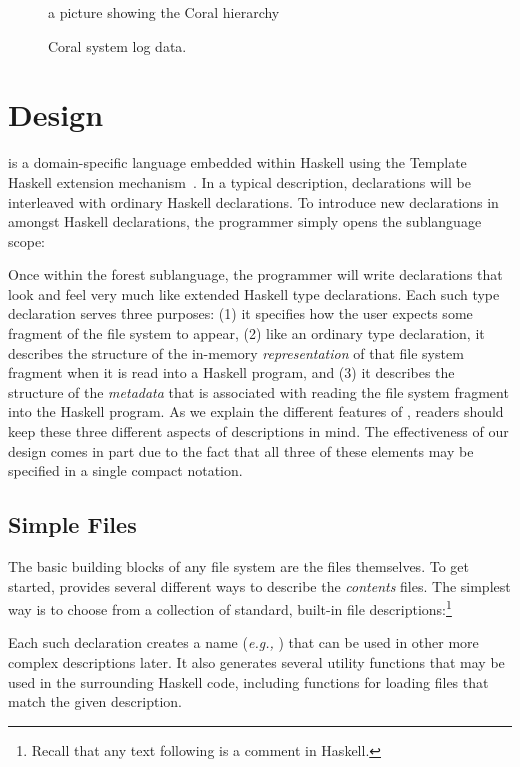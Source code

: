 \documentclass[natbib]{sigplanconf}
\begin{document}
\begin{figure}

a picture showing the Coral hierarchy

\caption{Coral system log data.}
\label{fig:coral-pic}
\end{figure}

\section{\forest{} Design}
\label{sec:review}

\forest{} is a domain-specific language embedded within Haskell using the
Template Haskell extension mechanism~\cite{metahaskell}.  In a typical
\forest{} description, \forest{} declarations will be interleaved with ordinary
Haskell declarations.  To introduce new \forest{} declarations in amongst
Haskell declarations,
the programmer simply opens the \forest{} sublanguage scope:
\begin{code}
\end{code}

Once within the forest sublanguage, the programmer will write declarations
that look and feel very much like extended Haskell type declarations.
Each such type declaration serves three purposes: (1) it specifies how the user
expects some fragment of the file system to appear, (2) like an ordinary type
declaration, it describes the structure of the in-memory {\em representation} of that 
file system fragment when it is read into a Haskell program, and (3) it describes 
the structure of the {\em metadata} that is associated with reading the file system
fragment into the Haskell program.  As we explain the different features of \forest{}, 
readers should keep these three different aspects of \forest{} descriptions in mind.  
The effectiveness of our design comes in part due to the fact that all three of these 
elements may be specified in a single compact notation.

\subsection{Simple Files}
\label{sec:basics}

The basic building blocks of any file system are the files themselves.  To get started,
\forest{} provides several different ways to describe the {\em contents} files.  The simplest
way is to choose from a collection of standard, built-in file descriptions:\footnote{Recall that
any text following \cd{--} is a comment in Haskell.} 
\noindent
\begin{code}
[forest| 
  type MyText = File Ptext   -- a text file
  type MyBin = File Pbin     -- a binary file
  type Whatever = File Pany  -- any file at all
|]
\end{code}
Each such declaration creates a name ({\it e.g.,} ) that can be used in other
more complex descriptions later.  It also generates several utility functions that may
be used in the surrounding Haskell code, including functions 
for loading files that match the given description.  
\end{document}

